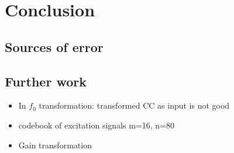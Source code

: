 \chapter{Conclusion} %
\label{cha:conclusion}

\section{Sources of error} %
\label{sec:sources_of_error}



\section{Further work} %
\label{sec:further_work}
\begin{itemize}
	\item In $f_0$ transformation: transformed CC as input is not good
	\item codebook of excitation signals m=16, n=80
	\item Gain transformation
\end{itemize}

